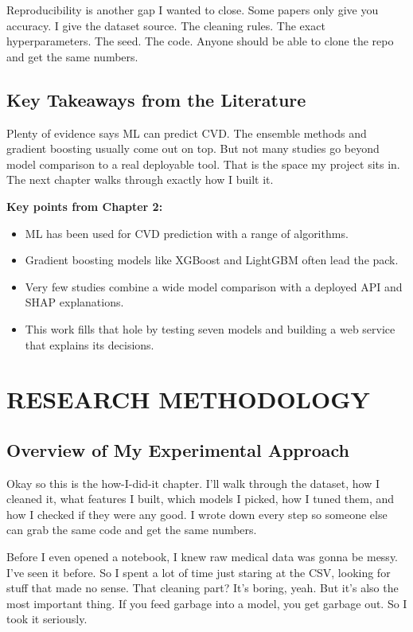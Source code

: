 \documentclass[12pt, a4paper, oneside]{book}
\begin{document}
Reproducibility is another gap I wanted to close. Some papers only give you accuracy. I give the dataset source. The cleaning rules. The exact hyperparameters. The seed. The code. Anyone should be able to clone the repo and get the same numbers.

\section{Key Takeaways from the Literature}
Plenty of evidence says ML can predict CVD. The ensemble methods and gradient boosting usually come out on top. But not many studies go beyond model comparison to a real deployable tool. That is the space my project sits in. The next chapter walks through exactly how I built it.

\begin{takeaway}
\textbf{Key points from Chapter 2:}
\begin{itemize}
  \item ML has been used for CVD prediction with a range of algorithms.
  \item Gradient boosting models like XGBoost and LightGBM often lead the pack.
  \item Very few studies combine a wide model comparison with a deployed API and SHAP explanations.
  \item This work fills that hole by testing seven models and building a web service that explains its decisions.
\end{itemize}
\end{takeaway}

\chapter{RESEARCH METHODOLOGY}

\section{Overview of My Experimental Approach}
Okay so this is the how-I-did-it chapter. I'll walk through the dataset, how I cleaned it, what features I built, which models I picked, how I tuned them, and how I checked if they were any good. I wrote down every step so someone else can grab the same code and get the same numbers.

Before I even opened a notebook, I knew raw medical data was gonna be messy. I've seen it before. So I spent a lot of time just staring at the CSV, looking for stuff that made no sense. That cleaning part? It's boring, yeah. But it's also the most important thing. If you feed garbage into a model, you get garbage out. So I took it seriously.
\end{document}
